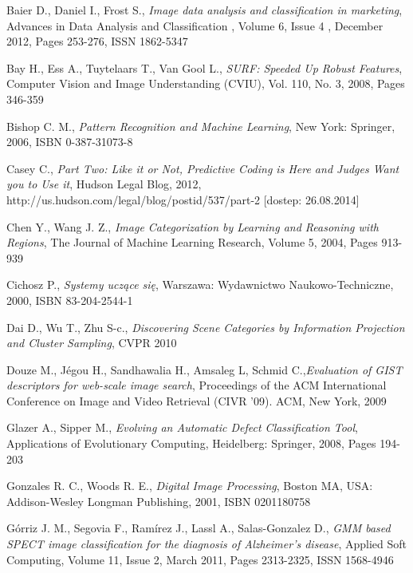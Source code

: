 \begin{thebibliography}{100} %

 Baier D., Daniel I., Frost S., \emph{Image data analysis and classification in marketing}, Advances in Data Analysis and Classification , Volume 6, Issue 4 , December 2012, Pages 253-276, ISSN 1862-5347

 Bay H., Ess A., Tuytelaars T., Van Gool L., \emph{SURF: Speeded Up Robust Features},  Computer Vision and Image Understanding (CVIU), Vol. 110, No. 3, 2008, Pages 346-359 

 Bishop C. M., \emph{Pattern Recognition and Machine Learning}, New York: Springer, 2006, ISBN 0-387-31073-8

 Casey C., \emph{Part Two: Like it or Not, Predictive Coding is Here and Judges Want you to Use it}, Hudson Legal Blog, 2012, http://us.hudson.com/legal/blog/postid/537/part-2 [dostep: 26.08.2014]

 Chen Y., Wang J. Z., \emph{Image Categorization by Learning and Reasoning with Regions}, The Journal of Machine Learning Research, Volume 5, 2004, Pages 913-939 

 Cichosz P., \emph{Systemy uczące się}, Warszawa: Wydawnictwo Naukowo-Techniczne, 2000, ISBN 83-204-2544-1

 Dai D., Wu T., Zhu S-c., \emph{Discovering Scene Categories by Information Projection and Cluster Sampling}, CVPR 2010

 Douze M., Jégou H., Sandhawalia H., Amsaleg L, Schmid C.,\emph{Evaluation of GIST descriptors for web-scale image search}, Proceedings of the ACM International Conference on Image and Video Retrieval (CIVR '09). ACM, New York, 2009


 Glazer A., Sipper M., \emph{Evolving an Automatic Defect Classification Tool}, Applications of Evolutionary Computing, Heidelberg: Springer, 2008, Pages 194-203

 Gonzales R. C., Woods R. E., \emph{Digital Image Processing}, Boston MA, USA: Addison-Wesley Longman Publishing, 2001, ISBN 0201180758

 Górriz J. M., Segovia F., Ramírez J., Lassl A., Salas-Gonzalez D., \emph{GMM based SPECT image classification for the diagnosis of Alzheimer’s disease}, Applied Soft Computing, Volume 11, Issue 2, March 2011, Pages 2313-2325, ISSN 1568-4946


\end{thebibliography}
